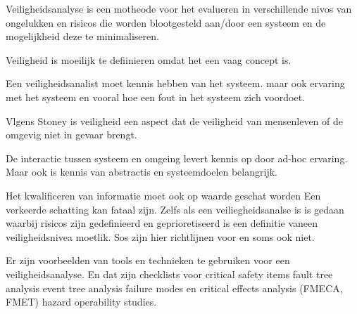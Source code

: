 Veiligheidsanalyse is een motheode voor het evalueren in verschillende nivos van ongelukken en risicos die worden blootgesteld aan/door een systeem en de mogelijkheid deze te minimaliseren.


Veiligheid is moeilijk te defiinieren omdat het een vaag concept is.

Een veiligheidsanalist  moet kennis hebben van het systeem. maar ook ervaring met het systeem en vooral hoe een fout in het systeem zich voordoet.

Vlgens Stoney is veiligheid een aspect dat de veiligheid van mensenleven  of de omgevig niet in gevaar brengt.

De interactie tussen systeem en omgeing levert kennis op door ad-hoc ervaring. Maar ook is kennis van abstractis en systeemdoelen belangrijk.

Het kwalificeren van informatie moet ook op waarde geschat worden Een verkeerde schatting kan fataal zijn. Zelfs als een veiliegheidsanalse is is gedaan waarbij risicos zijn gedefinieerd en geprioretiseerd is een definitie vaneen veiligheidsnivea moetlik. Sos zijn hier richtlijnen voor en soms ook niet.


Er zijn voorbeelden van tools en technieken te gebruiken voor een veiligheidsanalyse. En dat zijn checklists voor critical safety items
fault tree analysis
event tree analysis
failure modes en critical effects analysis (FMECA, FMET)
hazard operability studies.





\cite{winceckCriticalToSafety}
\cite{chambersHazardAnalysisSCS}
\cite{rslater1998SCSAnalysis}
%
%
%
\cite{knightchallengessafetyCritical}

